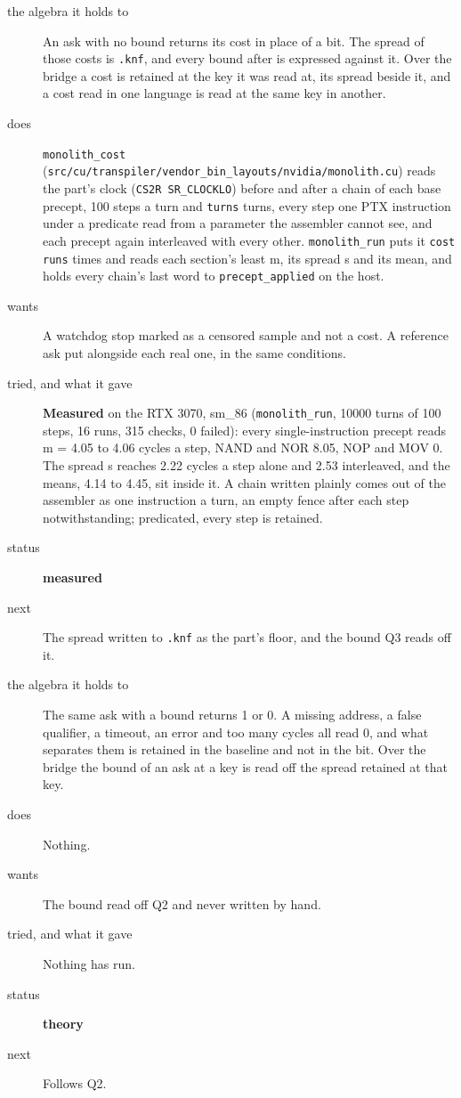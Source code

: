 \begin{description}
\item[{the algebra it holds to}] An ask with no bound returns its cost in place of a bit. The spread of those costs is \texttt{.\allowbreak{}knf}, and every bound after is expressed against it. Over the bridge a cost is retained at the key it was read at, its spread beside it, and a cost read in one language is read at the same key in another.
\item[{does}] \texttt{monolith\_\allowbreak{}cost} (\texttt{src/\allowbreak{}cu/\allowbreak{}transpiler/\allowbreak{}vendor\_\allowbreak{}bin\_\allowbreak{}layouts/\allowbreak{}nvidia/\allowbreak{}monolith.\allowbreak{}cu}) reads the part's clock (\texttt{CS2R SR\_\allowbreak{}CLOCKLO}) before and after a chain of each base precept, 100 steps a turn and \texttt{turns} turns, every step one PTX instruction under a predicate read from a parameter the assembler cannot see, and each precept again interleaved with every other. \texttt{monolith\_\allowbreak{}run} puts it \texttt{cost runs} times and reads each section's least m, its spread s and its mean, and holds every chain's last word to \texttt{precept\_\allowbreak{}applied} on the host.
\item[{wants}] A watchdog stop marked as a censored sample and not a cost. A reference ask put alongside each real one, in the same conditions.
\item[{tried, and what it gave}] \textbf{Measured} on the RTX 3070, sm\_\allowbreak{}86 (\texttt{monolith\_\allowbreak{}run}, 10000 turns of 100 steps, 16 runs, 315 checks, 0 failed): every single-instruction precept reads m = 4.05 to 4.06 cycles a step, NAND and NOR 8.05, NOP and MOV 0. The spread s reaches 2.22 cycles a step alone and 2.53 interleaved, and the means, 4.14 to 4.45, sit inside it. A chain written plainly comes out of the assembler as one instruction a turn, an empty fence after each step notwithstanding; predicated, every step is retained.
\item[{status}] \textbf{measured}
\item[{next}] The spread written to \texttt{.\allowbreak{}knf} as the part's floor, and the bound Q3 reads off it.
\end{description}

\begin{description}
\item[{the algebra it holds to}] The same ask with a bound returns 1 or 0. A missing address, a false qualifier, a timeout, an error and too many cycles all read 0, and what separates them is retained in the baseline and not in the bit. Over the bridge the bound of an ask at a key is read off the spread retained at that key.
\item[{does}] Nothing.
\item[{wants}] The bound read off Q2 and never written by hand.
\item[{tried, and what it gave}] Nothing has run.
\item[{status}] \textbf{theory}
\item[{next}] Follows Q2.
\end{description}

